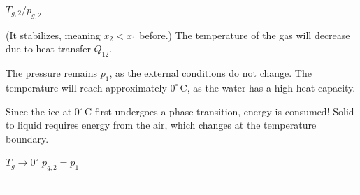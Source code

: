 \( T_{g,2} / p_{g,2} \)  

(It stabilizes, meaning \( x_2 < x_1 \) before.)  
The temperature of the gas will decrease due to heat transfer \( Q_{12} \).  

The pressure remains \( p_1 \), as the external conditions do not change.  
The temperature will reach approximately \( 0^\circ \, \text{C} \), as the water has a high heat capacity.  

Since the ice at \( 0^\circ \, \text{C} \) first undergoes a phase transition, energy is consumed!  
Solid to liquid requires energy from the air, which changes at the temperature boundary.  

\( T_{g} \to 0^\circ \)  
\( p_{g,2} = p_1 \)  

---